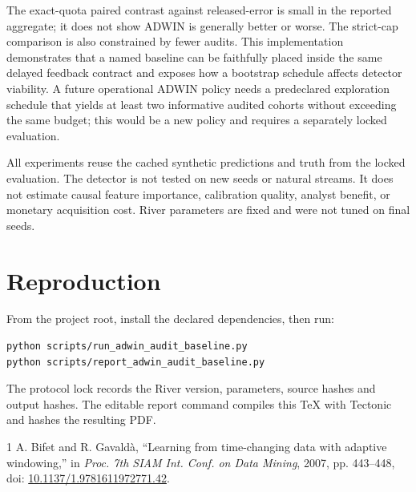\documentclass[10pt]{article}
\begin{document}
The exact-quota paired contrast against released-error is small in the reported aggregate; it does not show ADWIN is generally better or worse. The strict-cap comparison is also constrained by fewer audits. This implementation demonstrates that a named baseline can be faithfully placed inside the same delayed feedback contract and exposes how a bootstrap schedule affects detector viability. A future operational ADWIN policy needs a predeclared exploration schedule that yields at least two informative audited cohorts without exceeding the same budget; this would be a new policy and requires a separately locked evaluation.

All experiments reuse the cached synthetic predictions and truth from the locked evaluation. The detector is not tested on new seeds or natural streams. It does not estimate causal feature importance, calibration quality, analyst benefit, or monetary acquisition cost. River parameters are fixed and were not tuned on final seeds.
\section{Reproduction}
From the project root, install the declared dependencies, then run:
\begin{verbatim}
python scripts/run_adwin_audit_baseline.py
python scripts/report_adwin_audit_baseline.py
\end{verbatim}
The protocol lock records the River version, parameters, source hashes and output hashes. The editable report command compiles this TeX with Tectonic and hashes the resulting PDF.
\begin{thebibliography}{1}
 A. Bifet and R. Gavald\`a, ``Learning from time-changing data with adaptive windowing,'' in \emph{Proc. 7th SIAM Int. Conf. on Data Mining}, 2007, pp. 443--448, doi: \href{https://doi.org/10.1137/1.9781611972771.42}{10.1137/1.9781611972771.42}.
\end{thebibliography}
\end{document}
